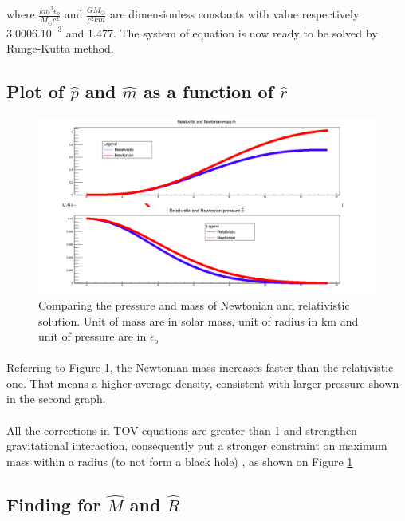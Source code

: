  where $ \frac{km^3\epsilon_o }{M_{\odot}c^2 }$ and $ \frac{GM_{\odot}}{c^2km}$ are dimensionless constants with value respectively $3.0006.10^{-3}$  and 1.477. The system of equation is now ready to be solved by Runge-Kutta method.

\subsection{Plot of $\hat{p}$ and $\hat{m}$ as a function of $\hat{r}$ }

\begin{figure}[!htbp]

\includegraphics[width=1.1\textwidth]{3_c.png}
\caption{Comparing the pressure and mass of Newtonian and relativistic solution. Unit of mass are in solar mass, unit of radius in km and unit of pressure are in $\epsilon_o$ }
\label{3c}

\end{figure}
\FloatBarrier
\paragraph{}
Referring to Figure \ref{3c}, the Newtonian mass increases faster than the relativistic one. That means a higher average density, consistent with larger pressure shown in the second graph.
\paragraph{}
All the corrections in TOV equations are greater than 1 and strengthen gravitational interaction, consequently put a stronger constraint on maximum mass within a radius (to not form a black hole) , as shown on Figure \ref{3c}

\subsection{Finding for $\hat{M}$ and $\hat{R}$}


